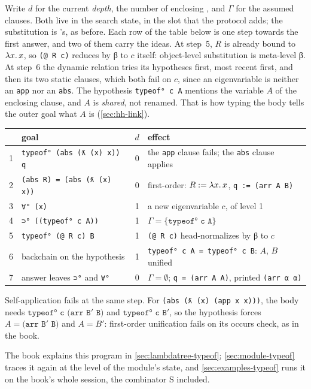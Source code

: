 \begin{tutorial}
Write $d$ for the current \emph{depth}, the number of enclosing , and $\Gamma$ for the assumed
clauses. Both live in the search state, in the slot that the protocol adds; the substitution is
\micro's, as before. Each row of the table below is one step towards the first answer, and two of them
carry the ideas. At step~5, $R$ is already bound to $\lambda x.\,x$, so \texttt{(@ R c)} reduces by β to $c$
itself: object-level substitution is meta-level β. At step~6 the dynamic relation tries its hypotheses
first, most recent first, and then its two static clauses, which both fail on $c$, since an
eigenvariable is neither an \texttt{app} nor an \texttt{abs}. The hypothesis \texttt{typeof° c A}
mentions the variable $A$ of the enclosing clause, and $A$ is \emph{shared}, not renamed. That is how
typing the body tells the outer goal what $A$ is (\cref{sec:hh-link}).
\begin{center}\small
\begin{tabular}{@{}r>{\raggedright\arraybackslash}p{5.6cm}cl@{}}
\toprule
& goal & $d$ & effect \\
\midrule
1 & \texttt{typeof° (abs (ƛ (x) x)) q} & 0 & the \texttt{app} clause fails; the \texttt{abs} clause applies\\
2 & \texttt{(abs R) = (abs (ƛ (x) x))} & 0 & first-order: $R := \lambda x.\,x$, \texttt{q := (arr A B)}\\
3 & \texttt{∀° (x)} & 1 & a new eigenvariable $c$, of level 1\\
4 & \texttt{⊃° ((typeof° c A))} & 1 & $\Gamma = \{\texttt{typeof° c A}\}$\\
5 & \texttt{typeof° (@ R c) B} & 1 & \texttt{(@ R c)} head-normalizes by β to $c$\\
6 & backchain on the hypothesis & 1 & \texttt{typeof° c A = typeof° c B}: $A$, $B$ unified\\
7 & answer leaves \texttt{⊃°} and \texttt{∀°} & 0 & $\Gamma=\emptyset$; \texttt{q = (arr A A)}, printed \texttt{(arr α α)}\\
\bottomrule
\end{tabular}
\end{center}
Self-application fails at the same step. For \texttt{(abs (ƛ (x) (app x x)))}, the body needs
$\texttt{typeof° c (arr B$'$ B)}$ and $\texttt{typeof° c B$'$}$, so the hypothesis forces
$A = \texttt{(arr B$'$ B)}$ and $A = B'$: first-order unification fails on its occurs check, as in the book.
\end{tutorial}
\noindent The book explains this program in \cref{sec:lambdatree-typeof}; \cref{sec:module-typeof} traces
it again at the level of the module's state, and \cref{sec:examples-typeof} runs it on the book's whole
session, the combinator S included.

